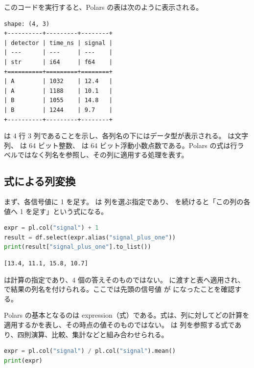 このコードを実行すると、Polars の表は次のように表示される。

\begin{lstlisting}[numbers=none, xleftmargin=2\zw]
shape: (4, 3)
+----------+---------+--------+
| detector | time_ns | signal |
| ---      | ---     | ---    |
| str      | i64     | f64    |
+==========+=========+========+
| A        | 1032    | 12.4   |
| A        | 1188    | 10.1   |
| B        | 1055    | 14.8   |
| B        | 1244    | 9.7    |
+----------+---------+--------+
\end{lstlisting}

 は 4 行 3 列であることを示し、各列名の下にはデータ型が表示される。 は文字列、 は 64 ビット整数、 は 64 ビット浮動小数点数である。Polars の式は行ラベルではなく列名を参照し、その列に適用する処理を表す。

\subsection{式による列変換}

まず、各信号値に 1 を足す。 は  列を選ぶ指定であり、 を続けると「この列の各値へ 1 を足す」という式になる。

\begin{lstlisting}[language=Python]
expr = pl.col("signal") + 1
result = df.select(expr.alias("signal_plus_one"))
print(result["signal_plus_one"].to_list())
\end{lstlisting}

\begin{lstlisting}[numbers=none, xleftmargin=2\zw]
[13.4, 11.1, 15.8, 10.7]
\end{lstlisting}

 は計算の指定であり、4 個の答えそのものではない。 に渡すと表へ適用され、 で結果の列名を付けられる。ここでは先頭の信号値  が  になったことを確認する。

Polars の基本となるのは expression（式）である。式は、列に対してどの計算を適用するかを表し、その時点の値そのものではない。 は  列を参照する式であり、四則演算、比較、集計などと組み合わせられる。

\begin{lstlisting}[language=Python]
expr = pl.col("signal") / pl.col("signal").mean()
print(expr)
\end{lstlisting}

